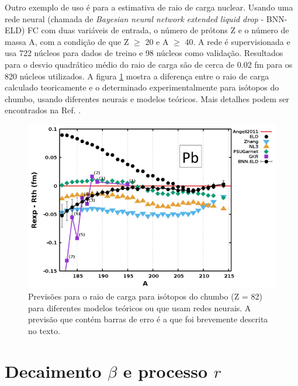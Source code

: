 \documentclass[a4paper,12pt,oneside]{book}
\begin{document}
\begin{appendices}
\par Outro exemplo de uso é para a estimativa de raio de carga nuclear. Usando uma rede neural (chamada de \textit{Bayesian neural network extended liquid drop} - BNN-ELD) FC com duas variáveis de entrada, o número de prótons Z e o número de massa A, com a condição de que Z $\geq$ 20 e A $\geq$ 40. A rede é supervisionada e usa 722 núcleos para dados de treino e 98 núcleos como validação. Resultados para o desvio quadrático médio do raio de carga são de cerca de 0.02 fm para os 820 núcleos utilizados. A figura \ref{fig:radii} mostra a diferença entre o raio de carga calculado teoricamente e o determinado experimentalmente para isótopos do chumbo, usando diferentes neurais e modelos teóricos. Mais detalhes podem ser encontrados na Ref. \cite{raio_carga}.

\begin{figure}[H]
    \centering
    \includegraphics[scale = 0.60]{figs/radii.png}
    \caption{Previsões para o raio de carga para isótopos do chumbo (Z = 82) para diferentes modelos teóricos ou que usam redes neurais. A previsão que contém barras de erro é a que foi brevemente descrita no texto.}
    \label{fig:radii}
\end{figure}


\section{Decaimento $\beta$ e processo $r$}


\end{appendices}
\end{document}
